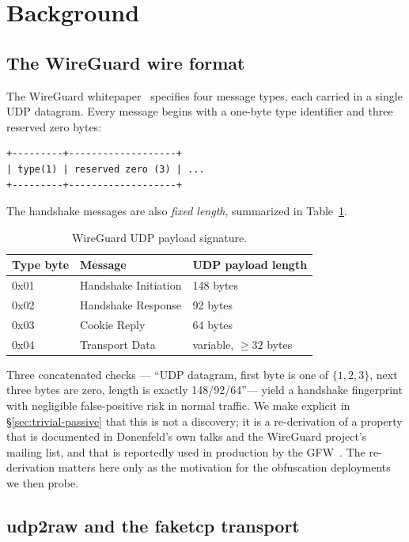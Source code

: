 \documentclass[conference]{IEEEtran}
\begin{document}
\section{Background}
\label{sec:background}

\subsection{The WireGuard wire format}

The WireGuard whitepaper~\cite{donenfeld2017} specifies four message types,
each carried in a single UDP datagram. Every message begins with a one-byte
type identifier and three reserved zero bytes:

\begin{lstlisting}
+---------+-------------------+
| type(1) | reserved zero (3) | ...
+---------+-------------------+
\end{lstlisting}

The handshake messages are also \textit{fixed length}, summarized in
Table~\ref{tab:wgtypes}.

\begin{table}[t]
\centering
\caption{WireGuard UDP payload signature.}
\label{tab:wgtypes}
\begin{tabular}{@{}lll@{}}
\toprule
Type byte & Message & UDP payload length \\
\midrule
0x01 & Handshake Initiation & 148 bytes \\
0x02 & Handshake Response   &  92 bytes \\
0x03 & Cookie Reply         &  64 bytes \\
0x04 & Transport Data       & variable, $\geq 32$ bytes \\
\bottomrule
\end{tabular}
\end{table}

Three concatenated checks --- ``UDP datagram, first byte is one of
$\{1,2,3\}$, next three bytes are zero, length is exactly 148/92/64''---
yield a handshake fingerprint with negligible false-positive risk in normal
traffic. We make explicit in \S\ref{sec:trivial-passive} that this is not
a discovery; it is a re-derivation of a property that is documented in
Donenfeld's own talks and the WireGuard project's mailing list, and that
is reportedly used in production by the GFW~\cite{wu2023gfw}. The
re-derivation matters here only as the motivation for the obfuscation
deployments we then probe.

\subsection{udp2raw and the faketcp transport}
\end{document}
